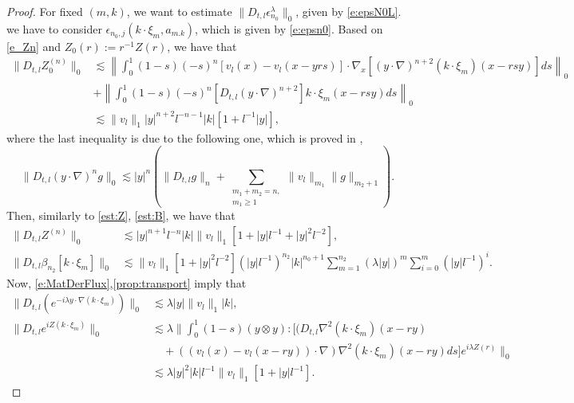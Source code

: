 \documentclass[10pt,a4paper]{amsart}
\numberwithin{equation}{section}
\numberwithin{corollario}{section}
\numberwithin{lemma}{section}
\numberwithin{prop}{section}
\theoremstyle{definition}
\theoremstyle{remark}
\begin{document}
\begin{proof}
     For fixed $(m,k)$, we want to estimate $\|D_{t,l}\epsilon_{n_0}^{\lambda}\|_0$, given by \eqref{e:epsN0L}. we have to consider $\epsilon_{n_0,j}(k\cdot \xi_m,a_{m.k})$, which is given by \eqref{e:epsn0}.
Based on \eqref{e_Zn} and $Z_0(r):=r^{-1}Z(r)$, we have that
\begin{equation}
\begin{aligned}
    \|D_{t,l}Z^{(n)}_0\|_0
    &\lesssim 
    \left\|\int_0^1(1-s)(-s)^n[v_l(x)-v_l(x-yrs)]\cdot \nabla_x[(y\cdot \nabla)^{n+2}(k\cdot\xi_m)(x-rsy)]ds\right\|_0 
    \\
    &+
    \left\|\int_0^1(1-s)(-s)^n[D_{t,l}(y\cdot \nabla)^{n+2}]k\cdot\xi_m(x-rsy)ds\right\|_0
    \\
    &\lesssim
    \|v_l\|_1|y|^{n+2}l^{-n-1}|k|[1+l^{-1}|y|],
\end{aligned}
\end{equation}
where the last inequality is due to the following one, which is proved in \cite{DLK23},
\begin{equation}\label{e:techical1}
    \|D_{t,l}(y\cdot\nabla)^{n}g\|_0
    \lesssim 
    |y|^{n}
    \left(\|D_{t,l}g\|_n+\sum_{\substack{m_1+m_2=n,\\m_1\geq 1}} \|v_l\|_{m_1}\|g\|_{m_2+1}\right).
\end{equation}
Then, similarly to \eqref{est:Z}, \eqref{est:B}, we have that
\begin{align}
    \label{est:DZ} \|D_{t,l}Z^{(n)}\|_0
    &\lesssim 
    |y|^{n+1}l^{-n}|k|\|v_l\|_1[1+|y|l^{-1}+|y|^2l^{-2}],\\
    \label{est:DB} \|D_{t,l}\beta_{n_2}[k\cdot \xi_m]\|_0
    &\lesssim
    \|v_l\|_1[1+|y|^2l^{-2}](|y|l^{-1})^{n_2}|k|^{n_0+1}\sum_{m=1}^{n_2}(\lambda |y|)^m\sum_{i=0}^m(|y|l^{-1})^{i}.
\end{align}
Now, \eqref{e:MatDerFlux},\eqref{prop:transport} imply that
\begin{align}
    \label{est:DexpGradXi} \|D_{t,l}(e^{-i\lambda y\cdot \nabla (k\cdot \xi_m)})\|_0&\lesssim \lambda |y|\|v_l\|_1|k|,\\
    \label{est:DexpZ}
        \|D_{t,l}e^{iZ(k\cdot \xi_m)}\|_0
        &\lesssim
        \lambda \Bigg\|\int_0^1(1-s)(y\otimes y):[(D_{t,l}\nabla^2(k\cdot \xi_m)(x-ry)\\
        &\quad+\left((v_l(x)-v_l(x-ry))\cdot\nabla\right)\nabla^2(k\cdot \xi_m)(x-ry)ds]e^{i\lambda Z(r)}\Bigg\|_0\\
        &\lesssim\lambda |y|^2|k|l^{-1}\|v_l\|_1[1+|y|l^{-1}].

\end{align}
\end{proof}
\end{document}

